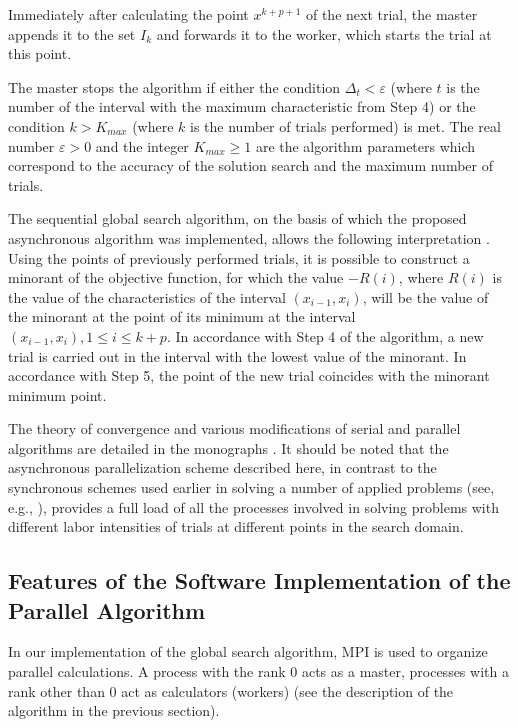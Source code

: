 \documentclass[mathematics,article,accept,pdftex,moreauthors]{Definitions/mdpi}
\begin{document}
	Immediately after calculating the point $x^{k+p+1}$ of the next trial, the master appends it to the set $I_k$ and forwards it to the worker, which starts the trial at this point. 
	
	The master stops the algorithm if either the condition $\Delta_{t}<\varepsilon$ ({where $t$ is the number} of the interval with the maximum characteristic from Step 4) or the condition $k>K_{max}$ (where $k$ is the number of trials performed) is met.
	The real number $\varepsilon>0$ and the integer $K_{max} \geq 1$ are the algorithm parameters which correspond to the accuracy of the solution search and the maximum number of trials.
	
	The sequential global search algorithm, on the basis of which the proposed asynchronous algorithm was implemented, allows the following interpretation \cite{Molinaro2001}. Using the points of previously performed trials, it is possible to construct a minorant of the objective function, for which the value $-R(i)$, where $R(i)$ is the value of the {characteristics} of the interval $(x_{i-1}, x_i)$, will be the value of the minorant at the point of its minimum at the interval $(x_{i-1},x_i), 1\leq i\leq k+p$. In accordance with Step 4 of the algorithm, a new trial is carried out in the interval with the lowest value of the minorant. In accordance with Step 5, the point of the new trial coincides with the minorant minimum point.
	
	The theory of convergence and various modifications of serial and parallel algorithms are detailed in the monographs \cite{Strongin2000,Sergeyev2017}. 
	It should be noted that the asynchronous parallelization scheme described here, in contrast to the synchronous schemes used earlier in solving a number of applied problems (see, e.g., \cite{Kalyulin2017}), provides a full load of all the processes involved in solving problems with different labor intensities of trials at different points in the search domain.
	
	
	\subsection{Features of the Software Implementation of the Parallel Algorithm}
	
	
	
	In our implementation of the global search algorithm, MPI is used to organize parallel calculations. A process with the rank 0 acts as a master, processes with a rank other than 0 act as calculators (workers) (see the description of the algorithm in the previous section).
	
\end{document}
